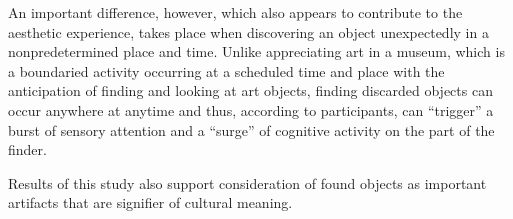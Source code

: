 An important difference, however, which also appears to contribute to the aesthetic experience, takes place when discovering an object unexpectedly in a nonpredetermined place and time. Unlike appreciating art in a museum, which is a boundaried activity occurring at a scheduled time and place with the anticipation of finding and looking at art objects, finding discarded objects can occur anywhere at anytime and thus, according to participants, can “trigger” a burst of sensory attention and a “surge” of cognitive activity on the part of the finder. 

Results of this study also support consideration of found objects as important artifacts that are signifier of cultural meaning.








